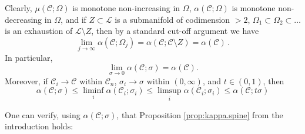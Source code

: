 \documentclass[11pt, letterpaper, reqno]{amsart}
\numberwithin{equation}{section}
\theoremstyle{remark}
\newcommand{\cC}{\mathcal{C}}
\newcommand{\cL}{\mathcal{L}}
\begin{document}
  Clearly, $\mu(\cC; \Omega)$ is monotone non-increasing in $\Omega$, $\alpha(\cC; \Omega)$ is monotone non-decreasing in $\Omega$, and if $Z\subset \cL$ is a submanifold of codimension $>2$, $\Omega_1\subset \Omega_2\subset \dots$ is an exhaustion of $\cL\setminus Z$, then by a standard cut-off argument we have 
  \begin{equation} \label{equ_alpha_exhaust limit}
    \lim_{j\to \infty}\alpha(\cC; \Omega_j) = \alpha(\cC; \cC\setminus Z) = \alpha(\cC)\,.       
  \end{equation}
  In particular,
\begin{equation} \label{eq:kappa.convergence.rho}
	\lim_{\sigma \to 0} \alpha(\cC; \sigma) = \alpha(\cC).
\end{equation}
Moreover, if $\cC_i \to \cC$ within $\mathscr{C}_n$, $\sigma_i \to \sigma$ within $(0, \infty)$, and $t \in (0, 1)$, then
\begin{equation} \label{eq:kappa.convergence.both}
	\alpha(\cC; \sigma) \leq \liminf_i \alpha(\cC_i; \sigma_i) \leq \limsup_i \alpha(\cC_i; \sigma_i) \leq \alpha(\cC; t \sigma)
\end{equation}

One can verify, using $\alpha(\cC; \sigma)$, that Proposition \ref{prop:kappa.spine} from the introduction holds: 
\end{document}
